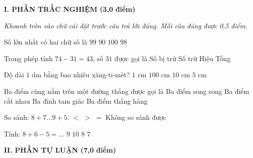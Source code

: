 
\setcounter{ex}{0}
\setcounter{bt}{0}

\textbf{\large I. PHẦN TRẮC NGHIỆM (3,0 điểm)}

{\itshape Khoanh tròn vào chữ cái đặt trước câu trả lời đúng. Mỗi câu đúng được 0,5 điểm.}

\begin{ex} %
Số lớn nhất có hai chữ số là
\choice
{\True $99$}
{$90$}
{$100$}
{$98$}
\end{ex}

\begin{ex} %
Trong phép tính $74 - 31 = 43$, số $31$ được gọi là
\choice
{Số bị trừ}
{\True Số trừ}
{Hiệu}
{Tổng}
\end{ex}

\begin{ex} %
Độ dài $1\text{ dm}$ bằng bao nhiêu xăng-ti-mét?
\choice
{$1\text{ cm}$}
{$100\text{ cm}$}
{\True $10\text{ cm}$}
{$5\text{ cm}$}
\end{ex}

\begin{ex} %
Ba điểm cùng nằm trên một đường thẳng được gọi là
\choice
{Ba điểm song song}
{Ba điểm cắt nhau}
{Ba đỉnh tam giác}
{\True Ba điểm thẳng hàng}
\end{ex}

\begin{ex} %
So sánh: $8 + 7 \dots 9 + 5$.
\choice
{$<$}
{\True $>$}
{$=$}
{Không so sánh được}
\end{ex}

\begin{ex} %
Tính: $8 + 6 - 5 = \dots$
\choice
{\True $9$}
{$10$}
{$8$}
{$7$}
\end{ex}

\vspace{4mm}
\textbf{\large II. PHẦN TỰ LUẬN (7,0 điểm)}

